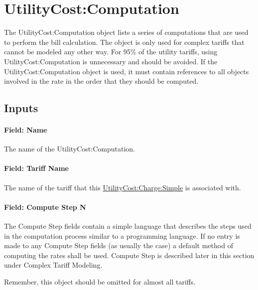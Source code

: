 \section{UtilityCost:Computation}\label{utilitycostcomputation}

The UtilityCost:Computation object lists a series of computations that are used to perform the bill calculation. The object is only used for complex tariffs that cannot be modeled any other way. For 95\% of the utility tariffs, using UtilityCost:Computation is unnecessary and should be avoided. If the UtilityCost:Computation object is used, it must contain references to all objects involved in the rate in the order that they should be computed.

\subsection{Inputs}\label{inputs-069}

\paragraph{Field: Name}\label{field-name-062}

The name of the UtilityCost:Computation.

\paragraph{Field: Tariff Name}\label{field-tariff-name-001}

The name of the tariff that this \hyperref[utilitycostchargesimple]{UtilityCost:Charge:Simple} is associated with.

\paragraph{Field: Compute Step N}\label{field-compute-step-n}

The Compute Step fields contain a simple language that describes the steps used in the computation process similar to a programming language. If no entry is made to any Compute Step fields (as usually the case) a default method of computing the rates shall be used. Compute Step is described later in this section under Complex Tariff Modeling.

Remember, this object should be omitted for almost all tariffs.